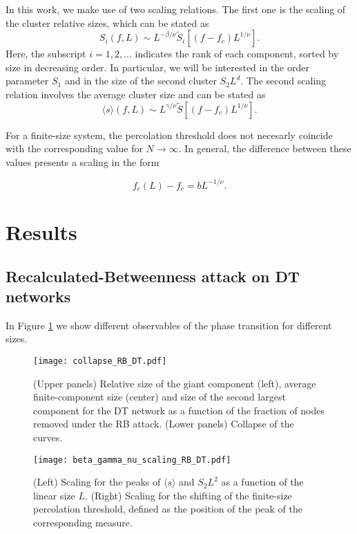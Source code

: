 \documentclass{article}
\begin{document}
In this work, we make use of two scaling relations. The first one is the scaling of the cluster relative sizes, which can be stated as  \cite{Zhu2017FiniteTransition}
%
\begin{equation}
\label{eq:comp-scaling}
S_i(f,L) \sim L^{-\beta /\nu} \tilde{S}_i[(f-f_c) L^{1/\nu}].
\end{equation}
%
 Here, the subscript $i=1,2, ...$ indicates the rank of each component, sorted by size in decreasing order. In particular, we will be interested in the order parameter $S_1$ and in the size of the second cluster $S_2L^d$. The second scaling relation involves the average cluster size and can be stated as
%
\begin{equation}
\label{eq:suscep-scaling}
\langle s \rangle(f,L)  \sim L^{\gamma / \nu} \tilde{S} [(f-f_c) L^{1/\nu}].
\end{equation}
%


For a finite-size system, the percolation threshold does not necesarly coincide with the corresponding value for $N\rightarrow \infty$. In general, the difference between these values presents a scaling in the form

\begin{equation} \label{eq:peak_pos_shift}
f_c(L) - f_c = b L^{-1/\nu}.
\end{equation}

\section{Results}

\subsection{Recalculated-Betweenness attack on DT networks}

In Figure \ref{fig:collapse_RB_DT} we show different observables of the phase transition for different sizes.


\begin{figure}
\centering
\texttt{[image: collapse\_RB\_DT.pdf]}
\caption{\label{fig:collapse_RB_DT} (Upper panels) Relative size of the giant component (left), average finite-component size (center) and size of the second largest component for the DT network as a function of the fraction of nodes removed under the RB attack. (Lower panels) Collapse of the curves.}
\end{figure}


\begin{figure}
\centering
\texttt{[image: beta\_gamma\_nu\_scaling\_RB\_DT.pdf]}
\caption{\label{fig:exponents}(Left) Scaling for the peaks of $\langle s \rangle$ and $S_2 L^2$ as a function of the linear size $L$. (Right) Scaling for the shifting of the finite-size percolation threshold, defined as the position of the peak of the corresponding measure.}
\end{figure}
\end{document}
